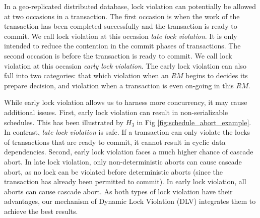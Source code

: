 \documentclass[conference]{IEEEtran}
\begin{document}
In a geo-replicated distributed database, lock violation can potentially be allowed at two occasions in a transaction.
The first occasion is when the work of the transaction has been completed successfully and the transaction is ready to commit.
We call lock violation at this occasion \emph{late lock violation}. It is only intended to reduce the contention in the commit phases of transactions.
The second occasion is before the transaction is ready to commit. We call lock violation at this occasion \emph{early lock violation}. 
The early lock violation can also fall into two categories: 
that which violation when an ${RM}$ begins to decides its prepare decision, 
and violation when a transaction is even on-going in this ${RM}$. 


While early lock violation allows us to harness more concurrency, it may cause additional issues. 
First, early lock violation can result in non-serializable schedules. This has been illustrated by ${H_3}$ in Fig \ref{fig:schedule_abort_example}.
In contrast, \emph{late lock violation} is safe. If a transaction can only violate the locks of transactions that are ready to commit, it cannot result in cyclic data dependencies.
Second, early lock violation faces a much higher chance of cascade abort. In late lock violation, only non-deterministic aborts can cause cascade abort, as no lock can be violated before deterministic aborts (since the transaction has already been permitted to commit). In early lock violation, all aborts can cause cascade abort.
As both types of lock violation have their advantages, our mechanism of Dynamic Lock Violation (DLV) integrates them to achieve the best results.
\end{document}
